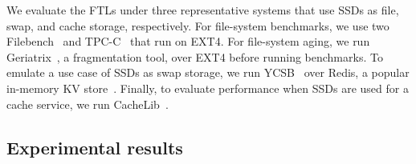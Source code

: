 We evaluate the FTLs under three representative systems that use SSDs as file,
swap, and cache storage, respectively.
For file-system benchmarks, we use two Filebench~\cite{filebench} and
TPC-C~\cite{TPC-C} that run on EXT4.  For file-system
aging, we run Geriatrix~\cite{geriatrix}, a fragmentation tool, over EXT4
before running benchmarks. 
To
emulate a use case of SSDs as swap storage, we run YCSB~\cite{ycsb} over Redis,
a popular in-memory KV store~\cite{redis}.  Finally, to evaluate performance
when SSDs are used for a cache service, we run CacheLib~\cite{cachelib}.

\subsection{Experimental results}

